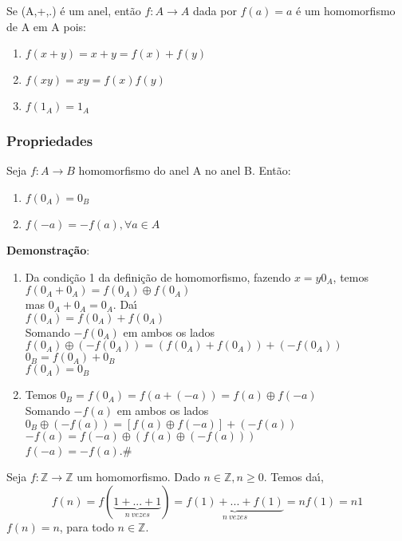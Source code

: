 Se (A,+,.) {\'e} um anel, ent{\~a}o $f:A\rightarrow A$ dada por $f(a)=a$ {\'e} um homomorfismo de A em A pois:
\begin{enumerate}
\item $f(x+y)=x+y=f(x)+f(y)$
\item $f(xy)=xy=f(x)f(y)$
\item $f(1_{A})=1_{A}$
\end{enumerate}

\subsubsection{Propriedades}
\begin{proposicao} Seja $f:A\rightarrow B$ homomorfismo do anel A no anel B. Ent{\~a}o:
\begin{enumerate}
\item $f(0_{A})=0_{B}$
\item $f(-a)=-f(a),\forall a\in A$
\end{enumerate}
\end{proposicao}

\textbf{Demonstra{\c c}{\~a}o}:
\begin{enumerate}
\item Da condi{\c c}{\~a}o 1 da defini{\c c}{\~a}o de homomorfismo, fazendo $x=y0_{A}$, temos\\
$f(0_{A}+0_{A})=f(0_{A})\oplus f(0_{A})$\\
mas $0_{A}+0_{A}=0_{A}$. Da{\'\i}\\
$f(0_{A})=f(0_{A})+f(0_{A})$\\
Somando $-f(0_{A})$ em ambos os lados\\
$f(0_{A})\oplus(-f(0_{A}))=(f(0_{A})+f(0_{A}))+(-f(0_{A}))$\\
$0_{B}=f(0_{A})+0_{B}$\\
$f(0_{A})=0_{B}$
\item Temos $0_{B}=f(0_{A})=f(a+(-a))=f(a)\oplus f(-a)$\\
Somando $-f(a)$ em ambos os lados\\
$0_{B}\oplus(-f(a))=[f(a)\oplus f(-a)]+(-f(a))$
$-f(a)=f(-a)\oplus(f(a)\oplus(-f(a)))$\\
$f(-a)=-f(a)$.\#
\end{enumerate}

Seja $f:\mathbb{Z}\rightarrow\mathbb{Z}$ um homomorfismo. Dado $n\in\mathbb{Z},n\geq 0$. Temos da{\'\i}, \[f(n)=f(\underbrace{1+...+1}_{n\ vezes})=\underbrace{f(1)+...+f(1)}_{n\ vezes}=nf(1)=n1\]
$f(n)=n$, para todo $n \in \mathbb{Z}$.

